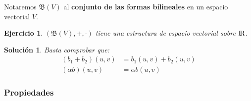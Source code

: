 \documentclass[10pt, a4paper]{article}
\theoremstyle{theorem-style}
\theoremstyle{definition-style}
\theoremstyle{remark-style}
\theoremstyle{example-style}
\theoremstyle{definition-style}
\newtheorem{ejer}{Ejercicio}[section]
\theoremstyle{remark-style}
\newtheorem*{sol}{Solución}
\begin{document}
Notaremos $\mathfrak{B}(V)$ al \textbf{conjunto de las formas bilineales} en un espacio vectorial $V$.

\pagebreak

\begin{ejer}
  $(\mathfrak{B}(V), +, \cdot)$ tiene una estructura de espacio vectorial sobre $\rm I\!R$.
\end{ejer}

\begin{sol}
  Basta comprobar que:
  \begin{align*}
	(b_1+b_2)(u,v)&=b_1(u,v)+b_2(u,v)\\(\alpha b)(u,v) &= \alpha b(u,v)
\end{align*}
\end{sol}

\subsubsection{Propiedades}
\end{document}
